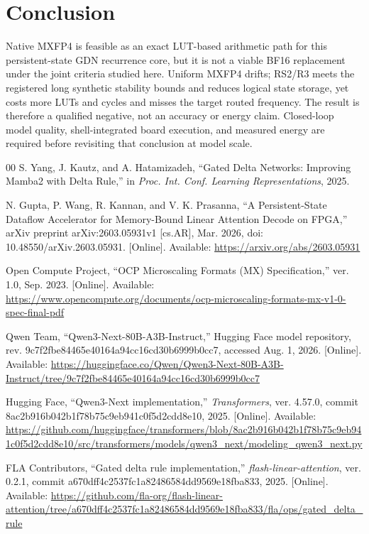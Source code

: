 \documentclass[conference]{IEEEtran}
\begin{document}
\section{Conclusion}
Native MXFP4 is feasible as an exact LUT-based arithmetic path for this
persistent-state GDN recurrence core, but it is not a viable BF16 replacement
under the joint criteria studied here. Uniform MXFP4 drifts; RS2/R3 meets the
registered long synthetic stability bounds and reduces logical state storage,
yet costs more LUTs and cycles and misses the target routed frequency. The
result is therefore a qualified negative, not an accuracy or energy claim.
Closed-loop model quality, shell-integrated board execution, and measured
energy are required before revisiting that conclusion at model scale.

\begin{thebibliography}{00}
S. Yang, J. Kautz, and A. Hatamizadeh, ``Gated Delta Networks: Improving
Mamba2 with Delta Rule,'' in \emph{Proc. Int. Conf. Learning Representations},
2025.

N. Gupta, P. Wang, R. Kannan, and V. K. Prasanna, ``A Persistent-State
Dataflow Accelerator for Memory-Bound Linear Attention Decode on FPGA,''
arXiv preprint arXiv:2603.05931v1 [cs.AR], Mar. 2026, doi:
10.48550/arXiv.2603.05931. [Online]. Available:
\url{https://arxiv.org/abs/2603.05931}

Open Compute Project, ``OCP Microscaling Formats (MX) Specification,'' ver.
1.0, Sep. 2023. [Online]. Available:
\url{https://www.opencompute.org/documents/ocp-microscaling-formats-mx-v1-0-spec-final-pdf}

Qwen Team, ``Qwen3-Next-80B-A3B-Instruct,'' Hugging Face model repository,
rev. 9c7f2fbe84465e40164a94cc16cd30b6999b0cc7, accessed Aug. 1, 2026.
[Online]. Available:
\url{https://huggingface.co/Qwen/Qwen3-Next-80B-A3B-Instruct/tree/9c7f2fbe84465e40164a94cc16cd30b6999b0cc7}

Hugging Face, ``Qwen3-Next implementation,'' \emph{Transformers}, ver. 4.57.0,
commit 8ac2b916b042b1f78b75c9eb941c0f5d2cdd8e10, 2025. [Online]. Available:
\url{https://github.com/huggingface/transformers/blob/8ac2b916b042b1f78b75c9eb941c0f5d2cdd8e10/src/transformers/models/qwen3_next/modeling_qwen3_next.py}

FLA Contributors, ``Gated delta rule implementation,''
\emph{flash-linear-attention}, ver. 0.2.1, commit
a670dff4c2537fc1a82486584dd9569e18fba833, 2025. [Online]. Available:
\url{https://github.com/fla-org/flash-linear-attention/tree/a670dff4c2537fc1a82486584dd9569e18fba833/fla/ops/gated_delta_rule}


\end{thebibliography}
\end{document}
